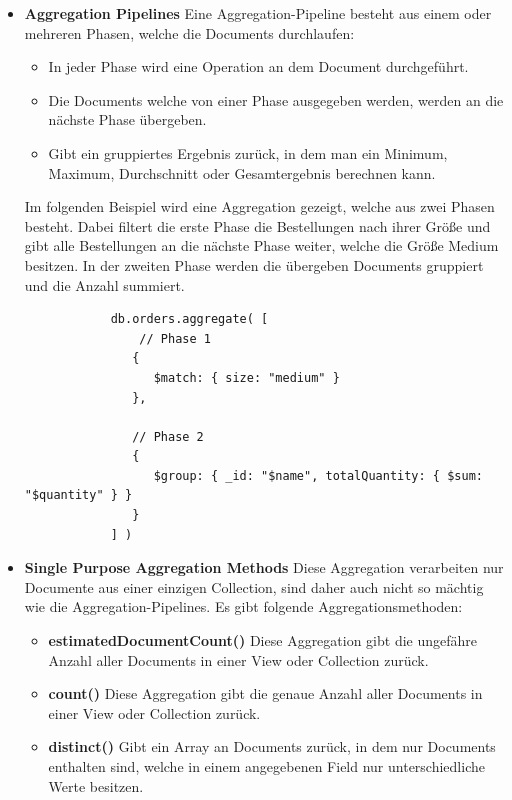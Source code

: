 \begin{itemize}
    \item \textbf{Aggregation Pipelines}
        \newline
         Eine Aggregation-Pipeline besteht aus einem oder mehreren Phasen, welche die Documents durchlaufen:
        \begin{itemize}
            \item In jeder Phase wird eine Operation an dem Document durchgeführt.
            \item Die Documents welche von einer Phase ausgegeben werden, werden an die nächste Phase übergeben.
            \item Gibt ein gruppiertes Ergebnis zurück, in dem man ein Minimum, Maximum, Durchschnitt oder Gesamtergebnis berechnen kann.
        \end{itemize}
        Im folgenden Beispiel wird eine Aggregation gezeigt, welche aus zwei Phasen besteht. Dabei filtert die erste Phase die Bestellungen nach ihrer Größe und gibt alle Bestellungen an die nächste Phase weiter, welche die Größe Medium besitzen. In der zweiten Phase werden die übergeben Documents gruppiert und die Anzahl summiert.
        \begin{lstlisting}
            db.orders.aggregate( [
                // Phase 1
               {
                  $match: { size: "medium" }
               },
            
               // Phase 2
               {
                  $group: { _id: "$name", totalQuantity: { $sum: "$quantity" } }
               }
            ] )
        \end{lstlisting}
    \item \textbf{Single Purpose Aggregation Methods}
        \newline
        Diese Aggregation verarbeiten nur Documente aus einer einzigen Collection, sind daher auch nicht so mächtig wie die Aggregation-Pipelines. Es gibt folgende Aggregationsmethoden:
        \begin{itemize}
            \item \textbf{estimatedDocumentCount()}
                \newline
                Diese Aggregation gibt die ungefähre Anzahl aller Documents in einer View oder Collection zurück.
            \item \textbf{count()}
                \newline
                Diese Aggregation gibt die genaue Anzahl aller Documents in einer View oder Collection zurück.
            \item \textbf{distinct()}
                \newline
                Gibt ein Array an Documents zurück, in dem nur Documents enthalten sind, welche in einem angegebenen Field nur unterschiedliche Werte besitzen.
        \end{itemize}
\end{itemize}
